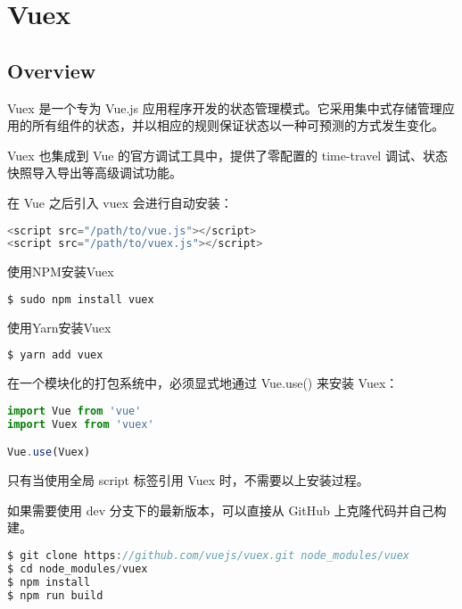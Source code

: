 \part{Vuex}


\chapter{Overview}


Vuex 是一个专为 Vue.js 应用程序开发的状态管理模式。它采用集中式存储管理应用的所有组件的状态，并以相应的规则保证状态以一种可预测的方式发生变化。

Vuex 也集成到 Vue 的官方调试工具中，提供了零配置的 time-travel 调试、状态快照导入导出等高级调试功能。



在 Vue 之后引入 vuex 会进行自动安装：

\begin{lstlisting}[language=JavaScript]
<script src="/path/to/vue.js"></script>
<script src="/path/to/vuex.js"></script>
\end{lstlisting}

\begin{compactitem}
\item 使用NPM安装Vuex


\begin{lstlisting}[language=JavaScript]
$ sudo npm install vuex
\end{lstlisting}


\item 使用Yarn安装Vuex


\begin{lstlisting}[language=JavaScript]
$ yarn add vuex
\end{lstlisting}

\end{compactitem}

在一个模块化的打包系统中，必须显式地通过 Vue.use() 来安装 Vuex：



\begin{lstlisting}[language=JavaScript]
import Vue from 'vue'
import Vuex from 'vuex'

Vue.use(Vuex)
\end{lstlisting}

只有当使用全局 script 标签引用 Vuex 时，不需要以上安装过程。

如果需要使用 dev 分支下的最新版本，可以直接从 GitHub 上克隆代码并自己构建。

\begin{lstlisting}[language=JavaScript]
$ git clone https://github.com/vuejs/vuex.git node_modules/vuex
$ cd node_modules/vuex
$ npm install
$ npm run build
\end{lstlisting}



